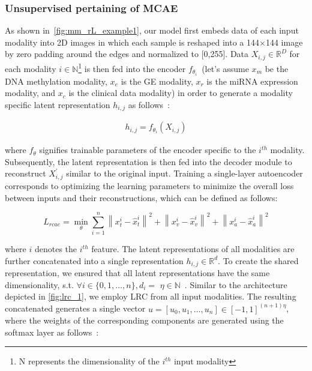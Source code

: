 \subsubsection{Unsupervised pertaining of MCAE}
As shown in~\cref{fig:mm_rL_example1}, our model first embeds data of each input modality into 2D images in which each sample is reshaped into a 144$\times$144 image by zero padding around the edges and normalized to [0,255]. 
Data $X_{i,j} \in \mathbb{R}^{D}$ for each modality $i \in \mathbb{N}$\footnote{N represents the dimensionality of the $i^{th}$ input modality} is then fed into the encoder $f_{\theta_{i}}$~(let's assume $x_m$ be the DNA methylation modality, $x_e$ is the GE modality, $x_r$ is the miRNA expression modality, and $x_c$ is the clinical data modality) in order to generate a modality specific latent representation $h_{i, j}$ as follows~\cite{mmdcae}: 

\vspace{-6mm}
\begin{align}
    h_{i,j}=f_{\theta_{i}}\left({X}_{i, j}\right)
\end{align}

\hspace*{3.5mm} where $f_\theta$ signifies trainable parameters of the encoder specific to the $i^{th}$ modality. Subsequently, the latent representation is then fed into the decoder module to reconstruct ${X}_{i, j}^{\prime}$ similar to the original input. 
Training a single-layer autoencoder corresponds to optimizing the learning parameters to minimize the overall loss between inputs and their reconstructions, which can be defined as follows:

\vspace{-6mm}
\begin{equation}
   L_{rcae} = \min _{\theta} \sum_{i=1}^{n} \left\|x_{t}^{i}-\hat{x}_{t}^{i}\right\|^{2}+\left\|x_{v}^{i}-\hat{x}_{v}^{i}\right\|^{2}+\left\|x_{a}^{i}-\hat{x}_{a}^{i}\right\|^{2}
   \label{eq:recons_loss_2}
\end{equation}

\hspace*{3.5mm} where $i$ denotes the $i^{th}$ feature. The latent representations of all modalities are further concatenated into a single representation $h_{i,j} \in \mathbb{R}^{d}$. To create the shared representation, we ensured that all latent representations have the same dimensionality, s.t. $\forall i \in\{0,1, \ldots, n\}, d_{i}=$ $\eta \in \mathbb{N}$~\cite{mmdcae}. Similar to the architecture depicted in \cref{fig:lrc_1}, we employ LRC from all input modalities. The resulting concatenated generates a single vector $u=\left[u_{0}, u_{1}, \ldots, u_{n}\right] \in[-1,1]^{(n+1) \eta}$, where the weights of the corresponding components are generated using the softmax layer as follows~\cite{mmdcae}:

